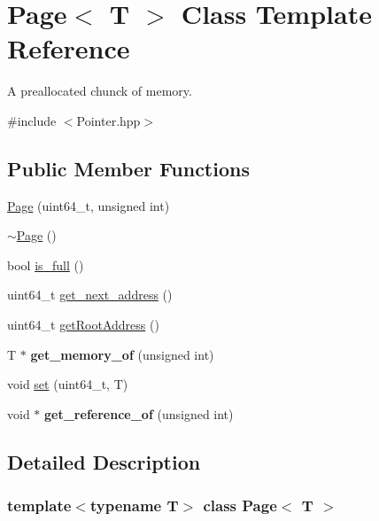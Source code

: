 \hypertarget{class_page}{}\section{Page$<$ T $>$ Class Template Reference}
\label{class_page}


A preallocated chunck of memory.  




{\ttfamily \#include $<$Pointer.\+hpp$>$}

\subsection*{Public Member Functions}
\begin{DoxyCompactItemize}
\item 
\hyperlink{class_page_ac9e22e2694dfa6a7dc4f80166c0217c5}{Page} (uint64\+\_\+t, unsigned int)
\item 
\hyperlink{class_page_a7312a131c7f52718cf4f2b6f487d31bf}{$\sim$\+Page} ()
\item 
bool \hyperlink{class_page_a8c27abd6fb2ce55c05b065584b4bcc75}{is\+\_\+full} ()
\item 
uint64\+\_\+t \hyperlink{class_page_ae6ac153d53ddb0493a4fff270dfa42cb}{get\+\_\+next\+\_\+address} ()
\item 
uint64\+\_\+t \hyperlink{class_page_a438a928e0ce67dc404f183678eb533ec}{get\+Root\+Address} ()
\item 
\mbox{\label{class_page_a2695af38818eda73c4e8b5e00d04fa55}} 
T $\ast$ {\bfseries get\+\_\+memory\+\_\+of} (unsigned int)
\item 
void \hyperlink{class_page_a4de67b2afdfe14758388f745a8a99d56}{set} (uint64\+\_\+t, T)
\item 
\mbox{\label{class_page_aefe72b00d99730ca199f7d42c1b7d95f}} 
void $\ast$ {\bfseries get\+\_\+reference\+\_\+of} (unsigned int)
\end{DoxyCompactItemize}


\subsection{Detailed Description}
\subsubsection*{template$<$typename T$>$\newline
class Page$<$ T $>$}

